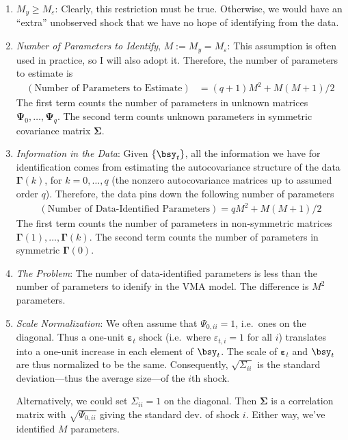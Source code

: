 \documentclass[12pt]{article}
\theoremstyle{plain}
\theoremstyle{definition}
\theoremstyle{remark}
\newcommand{\bsSigma}{\boldsymbol{\Sigma}}
\newcommand{\bsvarepsilon}{\boldsymbol{\varepsilon}}
\newcommand{\bsGamma}{\boldsymbol{\Gamma}}
\newcommand{\bsPsi}{\boldsymbol{\Psi}}
\begin{document}
\begin{enumerate}[label=(\roman*)]
  \item $M_y\geq M_\varepsilon$: Clearly, this restriction must be true.
    Otherwise, we would have an ``extra'' unobserved shock that we have
    no hope of identifying from the data.
  \item \emph{Number of Parameters to Identify}, $M:=M_y=M_\varepsilon$:
    This assumption is often used in practice, so I will also adopt it.
    Therefore, the number of parameters to estimate is
    \begin{align*}
      (\text{Number of Parameters to Estimate})
      &= (q+1) M^2
      + M(M+1)/2
    \end{align*}
    The first term counts the number of parameters in unknown matrices
    $\bsPsi_0,\ldots,\bsPsi_q$. The second term counts unknown
    parameters in symmetric covariance matrix $\bsSigma$.
  \item \emph{Information in the Data}: Given $\{\bsy_t\}$, all the
    information we have for identification comes from estimating the
    autocovariance structure of the data $\bsGamma(k)$, for
    $k=0,\ldots,q$ (the nonzero autocovariance matrices up to assumed
    order $q$). Therefore, the data pins down the following number of
    parameters
    \begin{align*}
      (\text{Number of Data-Identified Parameters})
      = q M^2
      + M(M+1)/2
    \end{align*}
    The first term counts the number of parameters in non-symmetric
    matrices $\bsGamma(1),\ldots,\bsGamma(k)$. The second term counts
    the number of parameters in symmetric $\bsGamma(0)$.

  \item \emph{The Problem}: The number of data-identified parameters
    is less than the number of parameters to idenify in the VMA model.
    The difference is $M^2$ parameters.

  \item \emph{Scale Normalization}: We often assume that
    $\Psi_{0,ii}=1$, i.e.\ ones on the diagonal. Thus a
    one-unit $\bsvarepsilon_t$ shock (i.e.\ where
    $\varepsilon_{t,i}=1$ for all $i$) translates into a one-unit
    increase in each element of $\bsy_t$. The scale of $\bsvarepsilon_t$
    and $\bsy_t$ are thus normalized to be the same. Consequently,
    $\sqrt{\Sigma_{ii}}$ is the standard deviation---thus the
    average size---of the $i$th shock.

    Alternatively, we could set $\Sigma_{ii}=1$ on the diagonal.
    Then $\bsSigma$ is a correlation matrix with $\sqrt{\Psi_{0,ii}}$
    giving the standard dev. of shock $i$. Either way, we've identified
    $M$ parameters.


\end{enumerate}
\end{document}
